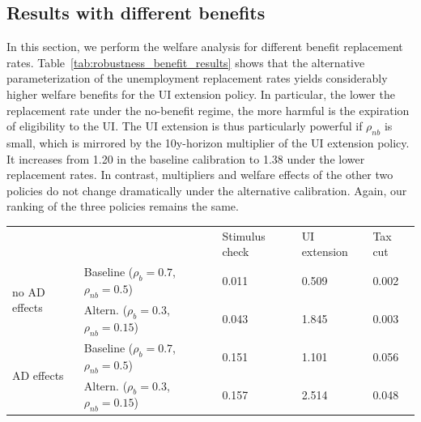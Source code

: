 \documentclass[\latexroot/\projectname]{subfiles}
\begin{document}
\FloatBarrier
\subsection*{Results with different benefits}
\whenintegrated{\label{sec:robust_benefits_results}} %

In this section, we perform the welfare analysis for different benefit replacement rates.
Table~\ref{tab:robustness_benefit_results} shows that the alternative parameterization of the unemployment replacement rates yields considerably higher welfare benefits for the UI extension policy.
In particular, the lower the replacement rate under the no-benefit regime, the more harmful is the expiration of eligibility to the UI.
The UI extension is thus particularly powerful if $\rho_{nb}$ is small, which is mirrored by the 10y-horizon multiplier of the UI extension policy.
It increases from 1.20 in the baseline calibration to 1.38 under the lower replacement rates.
In contrast, multipliers and welfare effects of the other two policies do not change dramatically under the alternative calibration.
Again, our ranking of the three policies remains the same.

\begin{center}
  \begin{tabular}
    {@{}lllll@{}}
    \toprule
                                   &                                                     & Stimulus check & UI extension & Tax cut \\ \cmidrule(l){1-5}
    \multirow{2}{*}{no AD effects} & Baseline  ($\rho_{b}\!=\!0.7$, $\rho_{nb}\!=\!0.5$) & 0.011          & 0.509        & 0.002   \\
                                   & Altern.  ($\rho_{b}\!=\!0.3$, $\rho_{nb}\!=\!0.15$) & 0.043          & 1.845        & 0.003   \\ \cmidrule(l){1-5}
    \multirow{2}{*}{AD effects}    & Baseline  ($\rho_{b}\!=\!0.7$, $\rho_{nb}\!=\!0.5$) & 0.151          & 1.101        & 0.056   \\
                                   & Altern.  ($\rho_{b}\!=\!0.3$, $\rho_{nb}\!=\!0.15$) & 0.157          & 2.514        & 0.048   \\ \cmidrule(l){1-5}
  \end{tabular}
  \label{tab:robustness_benefit_results}
\end{center}
\end{document}
